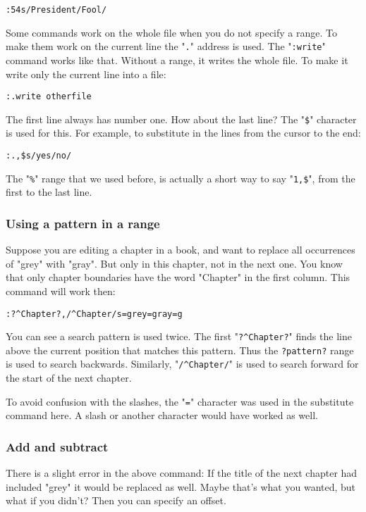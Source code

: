 {\begin{Verbatim}[samepage=true]
 :54s/President/Fool/
\end{Verbatim}

Some commands work on the whole file when you do not specify a range.
To make them work on the current line the "\texttt{.}" address is used.
The "\texttt{:write}" command works like that.
Without a range, it writes the whole file.
To make it write only the current line into a file:

\begin{Verbatim}[samepage=true]
 :.write otherfile
\end{Verbatim}

The first line always has number one.
How about the last line?
The "\texttt{\$}" character is used for this.
For example, to substitute in the lines from the cursor to the end:

\begin{Verbatim}[samepage=true]
 :.,$s/yes/no/
\end{Verbatim}

The "\texttt{\%}" range that we used before, is actually a short way to say "\texttt{1,\$}", from the first to the last line.
\subsubsection{Using a pattern in a range}
Suppose you are editing a chapter in a book, and want to replace all occurrences of "grey" with "gray".
But only in this chapter, not in the next one.
You know that only chapter boundaries have the word "Chapter" in the first column.
This command will work then:

\begin{Verbatim}[samepage=true]
 :?^Chapter?,/^Chapter/s=grey=gray=g
\end{Verbatim}

You can see a search pattern is used twice.
The first "\texttt{?\^{}Chapter?}" finds the line above the current position that matches this pattern.
Thus the \texttt{?pattern?} range is used to search backwards.
Similarly, "\texttt{/\^{}Chapter/}" is used to search forward for the start of the next chapter.

To avoid confusion with the slashes, the "\texttt{=}" character was used in the substitute command here.
A slash or another character would have worked as well.
\subsubsection{Add and subtract}
There is a slight error in the above command: If the title of the next chapter had included "grey" it would be replaced as well.
Maybe that's what you wanted, but what if you didn't?  Then you can specify an offset.

}

